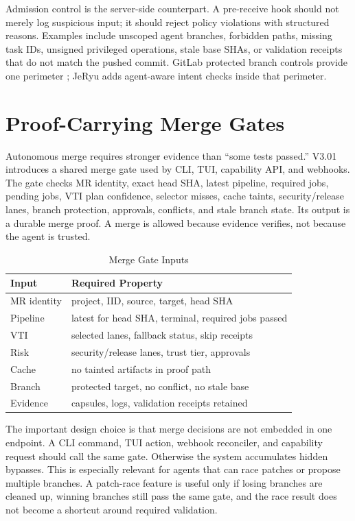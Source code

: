 \documentclass[conference]{IEEEtran}
\begin{document}
Admission control is the server-side counterpart. A pre-receive hook should not merely log suspicious input; it should reject policy violations with structured reasons. Examples include unscoped agent branches, forbidden paths, missing task IDs, unsigned privileged operations, stale base SHAs, or validation receipts that do not match the pushed commit. GitLab protected branch controls provide one perimeter \cite{gitlab-protected-branches}; JeRyu adds agent-aware intent checks inside that perimeter.

\section{Proof-Carrying Merge Gates}
Autonomous merge requires stronger evidence than ``some tests passed.'' V3.01 introduces a shared merge gate used by CLI, TUI, capability API, and webhooks. The gate checks MR identity, exact head SHA, latest pipeline, required jobs, pending jobs, VTI plan confidence, selector misses, cache taints, security/release lanes, branch protection, approvals, conflicts, and stale branch state. Its output is a durable merge proof. A merge is allowed because evidence verifies, not because the agent is trusted.

\begin{table}[t]
\caption{Merge Gate Inputs}
\centering
\begin{tabular}{ll}
\toprule
Input & Required Property\\
\midrule
MR identity & project, IID, source, target, head SHA\\
Pipeline & latest for head SHA, terminal, required jobs passed\\
VTI & selected lanes, fallback status, skip receipts\\
Risk & security/release lanes, trust tier, approvals\\
Cache & no tainted artifacts in proof path\\
Branch & protected target, no conflict, no stale base\\
Evidence & capsules, logs, validation receipts retained\\
\bottomrule
\end{tabular}
\end{table}

The important design choice is that merge decisions are not embedded in one endpoint. A CLI command, TUI action, webhook reconciler, and capability request should call the same gate. Otherwise the system accumulates hidden bypasses. This is especially relevant for agents that can race patches or propose multiple branches. A patch-race feature is useful only if losing branches are cleaned up, winning branches still pass the same gate, and the race result does not become a shortcut around required validation.
\end{document}
